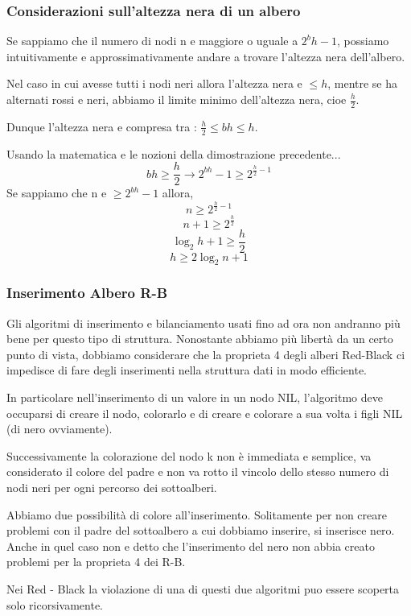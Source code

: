 \subsubsection{Considerazioni sull'altezza nera di un albero}

Se sappiamo che il numero di nodi n e maggiore o uguale a $2^bh -1$, possiamo intuitivamente e approssimativamente andare a trovare l'altezza nera dell'albero.

Nel caso in cui avesse tutti i nodi neri allora l'altezza nera e $\le h$, mentre se ha alternati rossi e neri, abbiamo il limite minimo dell'altezza nera, cioe $\frac{h}{2}$.

Dunque l'altezza nera e compresa tra : $\frac{h}{2} \le bh \le h$.

Usando la matematica e le nozioni della dimostrazione precedente...
$$bh \ge \frac{h}{2} \rightarrow 2^{bh} -1 \ge 2^{\frac{h}{2}-1}$$
Se sappiamo che n e $\ge 2^{bh}-1$ allora,
$$n \ge 2^{\frac{h}{2}-1}$$
$$n+1 \ge 2^{\frac{h}{2}}$$
$$\log_{2} h+1 \ge \frac{h}{2}$$
$$h \ge 2\log_{2} n+1$$

\subsubsection{Inserimento Albero R-B}
Gli algoritmi di inserimento e bilanciamento usati fino ad ora non andranno più bene per questo tipo di struttura. Nonostante abbiamo più libertà da un certo punto di vista, dobbiamo considerare che la proprieta 4 degli alberi Red-Black ci impedisce di fare degli inserimenti nella struttura dati in modo efficiente.
\smallskip

In particolare nell'inserimento di un valore in un nodo NIL, l'algoritmo deve occuparsi di creare il nodo, colorarlo e di creare e colorare a sua volta i figli NIL (di nero ovviamente).
\smallskip

Successivamente la colorazione del nodo k non è immediata e semplice, va considerato il colore del padre e non va rotto il vincolo dello stesso numero di nodi neri per ogni percorso dei sottoalberi.
\smallskip

Abbiamo due possibilità di colore all'inserimento. Solitamente per non creare problemi con il padre del sottoalbero a cui dobbiamo inserire, si inserisce nero. Anche in quel caso non e detto che l'inserimento del nero non abbia creato problemi per la proprieta 4 dei R-B.

Nei Red - Black la violazione di una di questi due algoritmi puo essere scoperta solo ricorsivamente.

